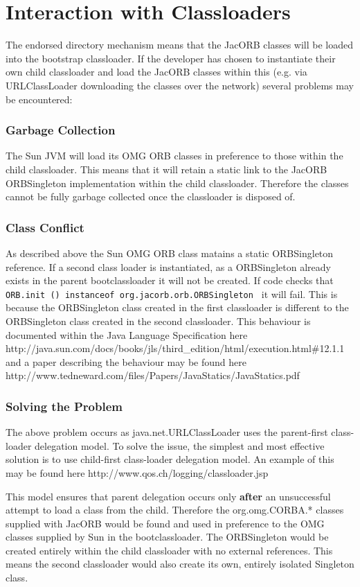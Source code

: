 \section{Interaction with Classloaders}
The endorsed directory mechanism means that the JacORB classes will be loaded
into the bootstrap classloader. If the developer has chosen to instantiate their
own child classloader and load the JacORB classes within this (e.g. via URLClassLoader
downloading the classes over the network) several problems may be encountered:

\subsubsection{Garbage Collection}
The Sun JVM will load its OMG ORB classes in preference to those within the child
classloader. This means that it will retain a static link to the JacORB ORBSingleton
implementation within the child classloader. Therefore the classes cannot be fully garbage
collected once the classloader is disposed of.

\subsubsection{Class Conflict}
As described above the Sun OMG ORB class matains a static ORBSingleton reference. If a second
class loader is instantiated, as a ORBSingleton already exists in the parent bootclassloader
it will not be created. If code checks that
{\tt ORB.init () instanceof org.jacorb.orb.ORBSingleton }
it will fail. This is because the ORBSingleton class created in the first classloader is different
to the ORBSingleton class created in the second classloader. This behaviour is documented within the
Java Language Specification here http://java.sun.com/docs/books/jls/third\_edition/html/execution.html\#12.1.1
and a paper describing the behaviour may be found here http://www.tedneward.com/files/Papers/JavaStatics/JavaStatics.pdf


\subsubsection{Solving the Problem}
The above problem occurs as java.net.URLClassLoader uses the parent-first class-loader delegation model.
To solve the issue, the simplest and most effective solution is to use child-first class-loader delegation
model. An example of this may be found here http://www.qos.ch/logging/classloader.jsp

This model ensures that parent delegation occurs only \textbf{after} an unsuccessful attempt to load a class from
the child. Therefore the org.omg.CORBA.* classes supplied with JacORB would be found and used in preference to
the OMG classes supplied by Sun in the bootclassloader. The ORBSingleton would be created entirely within the
child classloader with no external references. This means the second classloader would also create its own,
entirely isolated Singleton class.
